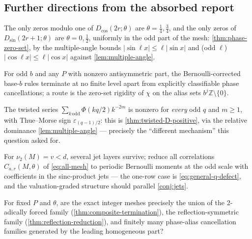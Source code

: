\documentclass[11pt,oneside]{article}
\numberwithin{equation}{section}
\theoremstyle{definition}
\theoremstyle{remark}
\newcommand{\Z}{\mathbb Z}
\newcommand{\eps}{\varepsilon}
\newcommand{\vtwo}{\nu_2}
\newcommand{\abs}[1]{\left\lvert #1\right\rvert}
\begin{document}
\subsection{Further directions from the absorbed report}

\begin{remark}
\label{conj:F-phase-zeros}
The only zeros modulo one of $D_{\cos}(2r;\theta)$ are
$\theta=\tfrac14,\tfrac34$, and the only zeros of
$D_{\sin}(2r+1;\theta)$ are $\theta=0,\tfrac12$, uniformly in the
odd part of the mesh: \cref{thm:phase-zero-set}, by the multiple-angle
bounds $\abs{\sin\ell x}\le\ell\abs{\sin x}$ and (odd $\ell$)
$\abs{\cos\ell x}\le\ell\abs{\cos x}$ against
\cref{lem:multiple-angle}.
\end{remark}

\begin{conjecture}
\label{conj:odd-base}
For odd $b$ and any $P$ with nonzero antisymmetric part, the
Bernoulli-corrected base-$b$ rules terminate at no finite level apart
from explicitly classifiable phase cancellations; a route is the
zero-set rigidity of $\chi$ on the alias sets
$b^{j}\Z\setminus\{0\}$.
\end{conjecture}

\begin{remark}
\label{q:twisted-D-positivity}
The twisted series $\sum_{k\,\mathrm{odd}}\Phi(kq/2)k^{-2m}$ is
nonzero for \emph{every} odd $q$ and $m\ge1$, with Thue--Morse sign
$\eps_{(q-1)/2}$: this is \cref{thm:twisted-D-positive}, via the
relative dominance \cref{lem:multiple-angle} --- precisely the
``different mechanism'' this question asked for.
\end{remark}

\begin{question}
\label{q:defect-hierarchy}
For $\vtwo(M)=v<d$, several jet layers survive; reduce all
correlations $C_{a,r}(M,\theta)$ of \eqref{eq:all-mesh} to periodic
Bernoulli moments at the odd scale with coefficients in the
sinc-product jets --- the one-row case is
\eqref{eq:general-q-defect}, and the valuation-graded structure
should parallel \cref{conj:jets}.
\end{question}

\begin{question}
\label{q:mesh-classification}
For fixed $P$ and $\theta$, are the exact integer meshes precisely the
union of the $2$-adically forced family
(\cref{thm:composite-termination}), the reflection-symmetric family
(\cref{thm:reflection-reduction}), and finitely many phase-alias
cancellation families generated by the leading homogeneous part?
\end{question}
\end{document}
